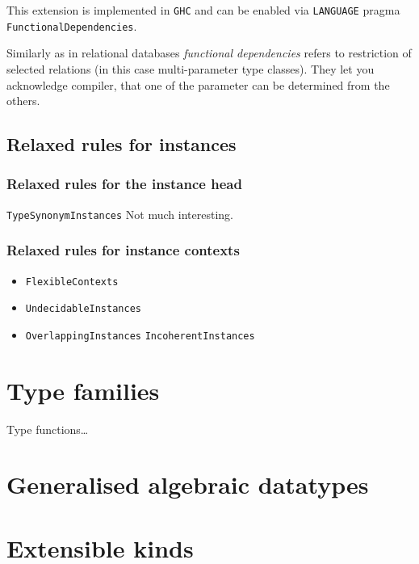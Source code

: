 \documentclass[11pt,oneside,draft]{fithesis2}
\theoremstyle{definition}
\begin{document}
This extension is implemented in \texttt{GHC} and can be enabled via
\texttt{LANGUAGE} pragma \texttt{FunctionalDependencies}.

Similarly as in relational databases \emph{functional dependencies} refers to
restriction of selected relations (in this case multi-parameter type classes).
They let you acknowledge compiler, that one of the parameter can be determined
from the others.

\subsection{Relaxed rules for instances}

\subsubsection{Relaxed rules for the instance head}

\texttt{TypeSynonymInstances} Not much interesting.

\subsubsection{Relaxed rules for instance contexts}

\begin{itemize}
\item \texttt{FlexibleContexts}
\item \texttt{UndecidableInstances}
\item \texttt{OverlappingInstances} \texttt{IncoherentInstances}
\end{itemize}

\section{Type families}

Type functions\dots

\cite{spjones:openTypeFunctions}
\cite{spjones:2009:funTypesFun}

\section{Generalised algebraic datatypes}

\cite{GADT+Kind=Dep}

\section{Extensible kinds}
\end{document}
